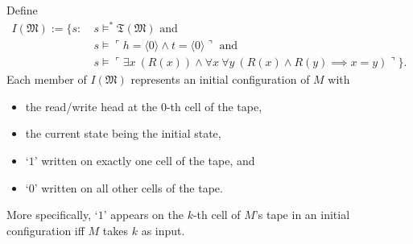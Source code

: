 \documentclass[12pt]{article}
\numberwithin{equation}{section}
\begin{document}
\begin{ex}
Define 
\begin{align*}
    I(\mathfrak{M}) := \{s : \ & s \models^* \mathfrak{T}(\mathfrak{M}) \text{ and } \\
    & s \models \ulcorner h = \langle 0 \rangle \wedge t = \langle 0 \rangle \urcorner \text{ and } \\
    & s \models \ulcorner \exists x \ (R(x)) \wedge \forall x \ \forall y \ (R(x) \wedge R(y) \implies x = y) \urcorner\} \text{.}
\end{align*}
Each member of $I(\mathfrak{M})$ represents an initial configuration of $M$ with \begin{itemize}
    \item the read/write head at the $0$-th cell of the tape, 
    \item the current state being the initial state, 
    \item `$1$' written on exactly one cell of the tape, and
    \item `$0$' written on all other cells of the tape.
\end{itemize} 
More specifically, `$1$' appears on the $k$-th cell of $M$'s tape in an initial configuration iff $M$ takes $k$ as input.


\end{ex}
\end{document}
